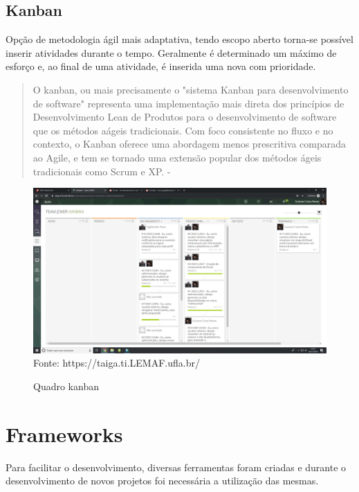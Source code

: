 \subsection{Kanban}
  Opção de metodologia ágil mais adaptativa, tendo escopo aberto torna-se possível inserir atividades durante o tempo.
  Geralmente é determinado um máximo de esforço e, ao final de uma atividade, é inserida uma nova com prioridade.

  \begin{quote}
    O kanban, ou mais precisamente o "sistema Kanban para desenvolvimento de software" representa uma implementação mais direta dos princípios de Desenvolvimento Lean de Produtos para o desenvolvimento de software que os métodos aágeis tradicionais. Com foco consistente no fluxo e no contexto, o Kanban oferece uma abordagem menos prescritiva comparada ao Agile, e tem se tornado uma extensão popular dos métodos ágeis tradicionais como Scrum e XP. - \cite{boeg2010kanban}
  \end{quote}
\begin{figure}[H]
\centering
\caption{Quadro kanban} %
\includegraphics[scale=0.2]{quadroKanban}\\  %
{\small Fonte: https://taiga.ti.LEMAF.ufla.br/} %
\label{fig:exemplo} %
\end{figure}

\section{Frameworks}

Para facilitar o desenvolvimento, diversas ferramentas foram criadas e durante o desenvolvimento de novos projetos foi necessária a utilização das mesmas.

